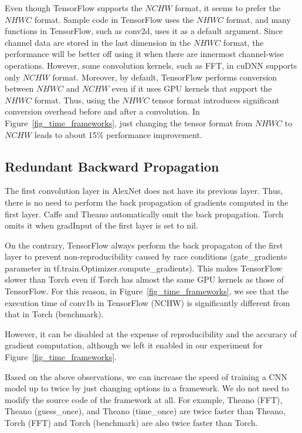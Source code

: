 Even though TensorFlow supports the $NCHW$ format, it seems to prefer the $NHWC$ format. Sample code in TensorFlow uses the $NHWC$ format, and many functions in TensorFlow, such as conv2d, uses it as a default argument. Since channel data are stored in the last dimension in the $NHWC$ format, the performance will be better off using it when there are innermost channel-wise operations. However, some convolution kernels, such as FFT, in cuDNN supports only $NCHW$ format. Moreover, by default, TensorFlow performs conversion between $NHWC$ and $NCHW$ even if it uses GPU kernels that support the $NHWC$ format. Thus, using the $NHWC$ tensor format introduces significant conversion overhead before and after a convolution. In Figure~\ref{fig_time_frameworks}, just changing the tensor format from $NHWC$ to $NCHW$ leads to about 15\% performance improvement. 

\subsection{Redundant Backward Propagation}
The first convolution layer in AlexNet does not have its previous layer. Thus, there is no need to perform the back propagation of gradients computed in the first layer. Caffe and Theano automatically omit the back propagation. Torch omits it when \textsf{gradInput} of the first layer is set to nil. 

On the contrary, TensorFlow always perform the back propagaton of the first layer to prevent non-reproducibility caused by race conditions (gate\_gradients parameter in tf.train.Optimizer.compute\_gradients). This makes TensorFlow slower than Torch even if Torch has almost the same GPU kernels as those of TensorFlow. For this reason, in Figure~\ref{fig_time_frameworks}, we see that the execution time of \textsf{conv1b} in \textsf{TensorFlow (NCHW)} is significantly different from that in \textsf{Torch (benchmark)}.  

However, it can be disabled at the expense of reproducibility and the accuracy of gradient computation, although we left it enabled in our experiment for Figure~\ref{fig_time_frameworks}.

Based on the above observations, we can increase the speed of training a CNN model up to twice by just changing options in a framework. We do not need to modify the source code of the framework at all. For example, \textsf{Theano (FFT)}, \textsf{Theano (guess\_once)}, and \textsf{Theano (time\_once)} are twice faster than \textsf{Theano}, \textsf{Torch (FFT)} and \textsf{Torch (benchmark)} are also twice faster than \textsf{Torch}. 

